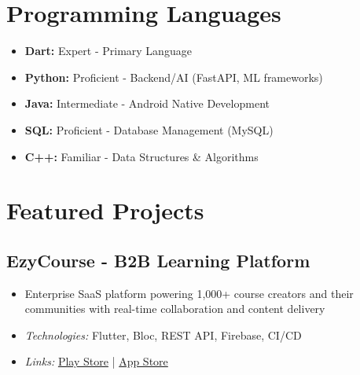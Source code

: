 \documentclass[a4paper,11pt]{article}
\begin{document}

\section{Programming Languages}

\begin{itemize}[leftmargin=*,noitemsep,topsep=4pt]
    \item \textbf{Dart:} Expert - Primary Language
    \item \textbf{Python:} Proficient - Backend/AI (FastAPI, ML frameworks)
    \item \textbf{Java:} Intermediate - Android Native Development
    \item \textbf{SQL:} Proficient - Database Management (MySQL)
    \item \textbf{C++:} Familiar - Data Structures \& Algorithms
\end{itemize}


\section{Featured Projects}

\subsection{EzyCourse - B2B Learning Platform}
\begin{itemize}[leftmargin=*,noitemsep,topsep=4pt]
    \item Enterprise SaaS platform powering 1,000+ course creators and their communities with real-time collaboration and content delivery
    \item \textit{Technologies:} Flutter, Bloc, REST API, Firebase, CI/CD
    \item \textit{Links:} \href{https://play.google.com/store/apps/details?id=com.ezycourse.ezycourse}{Play Store} | \href{https://apps.apple.com/fi/app/ezycourse/id6443599486}{App Store}
\end{itemize}
\end{document}
